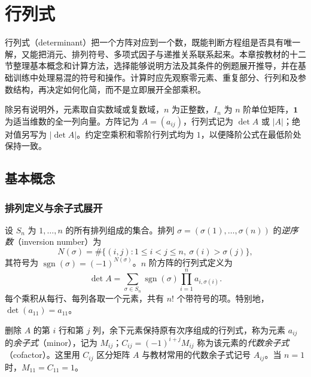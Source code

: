\setcounter{chapter}{0} %
\chapter{行列式}
\label{chap:determinants}

行列式（determinant）把一个方阵对应到一个数，既能判断方程组是否具有唯一解，又能把消元、排列符号、多项式因子与递推关系联系起来。本章按教材的十二节整理基本概念和计算方法，选择能够说明方法及其条件的例题展开推导，并在基础训练中处理易混的符号和操作。计算时应先观察零元素、重复部分、行列和及参数结构，再决定如何化简，而不是立即展开全部乘积。

除另有说明外，元素取自实数域或复数域，$n$ 为正整数，$I_n$ 为 $n$ 阶单位矩阵，$\mathbf1$ 为适当维数的全一列向量。方阵记为 $A=(a_{ij})$，行列式记为 $\det A$ 或 $|A|$；绝对值另写为 $|\det A|$。约定空乘积和零阶行列式均为 $1$，以便降阶公式在最低阶处保持一致。

\section{基本概念}
\label{sec:xie-ex-det-basics}

\subsection{排列定义与余子式展开}

\begin{definition}
\label{def:xie-ex-det-leibniz}
设 $S_n$ 为 $1,\ldots,n$ 的所有排列组成的集合。排列 $\sigma=(\sigma(1),\ldots,\sigma(n))$ 的\emph{逆序数}（inversion number）为
\[
N(\sigma)=\#\{(i,j):1\leq i<j\leq n,\ \sigma(i)>\sigma(j)\},
\]
其符号为 $\operatorname{sgn}(\sigma)=(-1)^{N(\sigma)}$。$n$ 阶方阵的行列式定义为
\begin{equation}
\label{eq:xie-ex-det-leibniz}
\det A=\sum_{\sigma\in S_n}\operatorname{sgn}(\sigma)
\prod_{i=1}^{n}a_{i,\sigma(i)}.
\end{equation}
每个乘积从每行、每列各取一个元素，共有 $n!$ 个带符号的项。特别地，$\det(a_{11})=a_{11}$。
\end{definition}

\begin{definition}
\label{def:xie-ex-det-cofactor}
删除 $A$ 的第 $i$ 行和第 $j$ 列，余下元素保持原有次序组成的行列式，称为元素 $a_{ij}$ 的\emph{余子式}（minor），记为 $M_{ij}$；$C_{ij}=(-1)^{i+j}M_{ij}$ 称为该元素的\emph{代数余子式}（cofactor）。这里用 $C_{ij}$ 区分矩阵 $A$ 与教材常用的代数余子式记号 $A_{ij}$。当 $n=1$ 时，$M_{11}=C_{11}=1$。
\end{definition}

